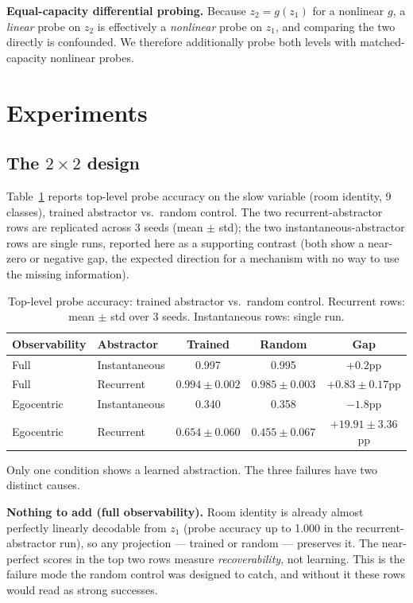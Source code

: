 \documentclass[11pt]{article}
\begin{document}
\textbf{Equal-capacity differential probing.} Because $z_2 = g(z_1)$ for a nonlinear $g$, a \emph{linear} probe on $z_2$ is effectively a \emph{nonlinear} probe on $z_1$, and comparing the two directly is confounded. We therefore additionally probe both levels with matched-capacity nonlinear probes.

\section{Experiments}

\subsection{The $2\times2$ design}

Table~\ref{tab:2x2} reports top-level probe accuracy on the slow variable (room identity, 9 classes), trained abstractor vs.\ random control. The two recurrent-abstractor rows are replicated across 3 seeds (mean $\pm$ std); the two instantaneous-abstractor rows are single runs, reported here as a supporting contrast (both show a near-zero or negative gap, the expected direction for a mechanism with no way to use the missing information).

\begin{table}[h]
\centering
\caption{Top-level probe accuracy: trained abstractor vs.\ random control. Recurrent rows: mean $\pm$ std over 3 seeds. Instantaneous rows: single run.}
\label{tab:2x2}
\begin{tabular}{llccc}
\toprule
Observability & Abstractor & Trained & Random & Gap \\
\midrule
Full & Instantaneous & 0.997 & 0.995 & $+0.2$pp \\
Full & Recurrent & $0.994\pm0.002$ & $0.985\pm0.003$ & $+0.83\pm0.17$pp \\
Egocentric & Instantaneous & 0.340 & 0.358 & $-1.8$pp \\
Egocentric & Recurrent & $\mathbf{0.654\pm0.060}$ & $\mathbf{0.455\pm0.067}$ & $\mathbf{+19.91\pm3.36}$pp \\
\bottomrule
\end{tabular}
\end{table}

Only one condition shows a learned abstraction. The three failures have two distinct causes.

\textbf{Nothing to add (full observability).} Room identity is already almost perfectly linearly decodable from $z_1$ (probe accuracy up to 1.000 in the recurrent-abstractor run), so any projection --- trained or random --- preserves it. The near-perfect scores in the top two rows measure \emph{recoverability}, not learning. This is the failure mode the random control was designed to catch, and without it these rows would read as strong successes.
\end{document}
